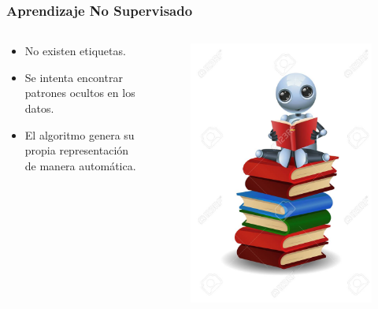 \documentclass[10pt]{beamer}
\begin{document}
\begin{frame}
    \frametitle{Aprendizaje No Supervisado}
    \begin{columns}
        \begin{column}{0.5\textwidth}
          \begin{itemize}
              \item No existen etiquetas.
              \item Se intenta encontrar patrones ocultos en los datos.
              \item El algoritmo genera su propia representación de manera automática.
          \end{itemize}
        \end{column}
        \begin{column}{0.5\textwidth}
          \begin{figure}[!h] 
            \centering
            \includegraphics[width=1\textwidth]{img/robot2}
          \end{figure}  
        \end{column}
      \end{columns}

\end{frame}
\end{document}
